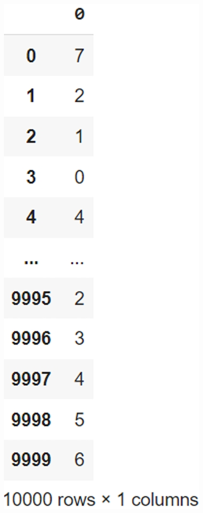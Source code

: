 \documentclass{book}
\begin{document}
\begin{center}
    \includegraphics[scale=0.2]{chapter 7/ch7_figure18.jpeg}
\end{center}
\end{document}
